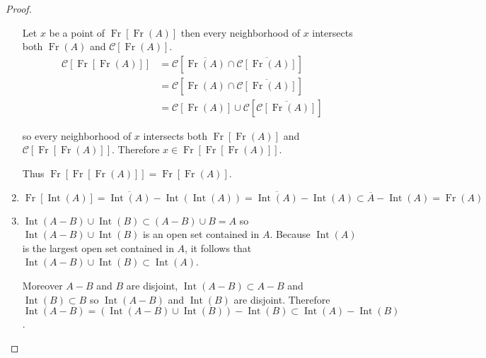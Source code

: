 \begin{proof}
\begin{enumerate}[label={(\alph*)},itemsep=0pt,leftmargin=*]
              Let \(x\) be a point of \( \operatorname{Fr}\left[\operatorname{Fr}(A)\right] \) then every neighborhood of \(x\) intersects both \( \operatorname{Fr}(A) \) and \( \mathscr{C}\left[\operatorname{Fr}(A)\right] \).
              \begingroup
              \allowdisplaybreaks%
              \begin{align*}
                  \mathscr{C}\left[ \operatorname{Fr}\left[\operatorname{Fr}(A)\right] \right] & = \mathscr{C}\left[ \overline{\operatorname{Fr}(A)} \cap \overline{\mathscr{C}\left[ \operatorname{Fr}(A) \right]} \right]          \\
                                                                                               & = \mathscr{C}\left[ \operatorname{Fr}(A) \cap \overline{\mathscr{C}\left[\operatorname{Fr}(A)\right]} \right]                       \\
                                                                                               & = \mathscr{C}\left[\operatorname{Fr}(A)\right] \cup \mathscr{C}\left[\overline{\mathscr{C}\left[\operatorname{Fr}(A)\right]}\right]
              \end{align*}
              \endgroup

              so every neighborhood of \(x\) intersects both \( \operatorname{Fr}\left[\operatorname{Fr}(A)\right] \) and \( \mathscr{C}\left[\operatorname{Fr}\left[\operatorname{Fr}(A)\right]\right] \). Therefore \( x \in \operatorname{Fr}\left[\operatorname{Fr}\left[\operatorname{Fr}(A)\right]\right] \).

              Thus \( \operatorname{Fr}\left[\operatorname{Fr}\left[\operatorname{Fr}(A)\right]\right] = \operatorname{Fr}\left[\operatorname{Fr}(A)\right] \).
        \item \( \operatorname{Fr}\left[ \operatorname{Int}(A) \right] = \overline{\operatorname{Int}(A)} - \operatorname{Int}(\operatorname{Int}(A)) = \overline{\operatorname{Int}(A)} - \operatorname{Int}(A) \subset \overline{A} - \operatorname{Int}(A) = \operatorname{Fr}(A) \)
        \item \( \operatorname{Int}(A - B) \cup \operatorname{Int}(B) \subset (A - B) \cup B = A \) so \( \operatorname{Int}(A - B) \cup \operatorname{Int}(B) \) is an open set contained in \( A \). Because \( \operatorname{Int}(A) \) is the largest open set contained in \(A\), it follows that \( \operatorname{Int}(A - B) \cup \operatorname{Int}(B) \subset \operatorname{Int}(A) \).


              Moreover \( A - B \) and \( B \) are disjoint, \( \operatorname{Int}(A - B) \subset A - B \) and \( \operatorname{Int}(B) \subset B \) so \( \operatorname{Int}(A - B) \) and \( \operatorname{Int}(B) \) are disjoint. Therefore \( \operatorname{Int}(A - B) = (\operatorname{Int}(A - B) \cup \operatorname{Int}(B)) - \operatorname{Int}(B) \subset \operatorname{Int}(A) - \operatorname{Int}(B) \).
    \end{enumerate}
\end{proof}

